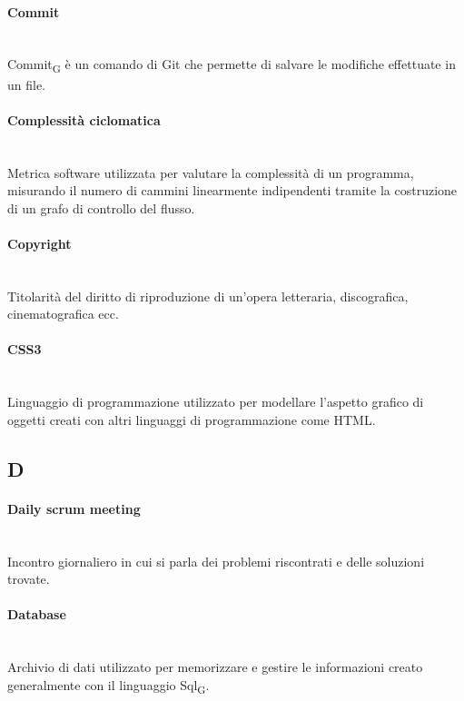 \paragraph{Commit}~\smallskip \\
Commit\textsubscript{G} è un comando di Git che permette di salvare le modifiche effettuate in un file.

\paragraph{Complessità ciclomatica}~\smallskip \\
Metrica software utilizzata per valutare la complessità di un programma, misurando il numero di cammini linearmente indipendenti tramite la costruzione di un grafo di controllo del flusso.

\paragraph{Copyright}~\smallskip \\
Titolarità del diritto di riproduzione di un'opera letteraria, discografica, cinematografica ecc.

\paragraph{CSS3}~\smallskip \\
Linguaggio di programmazione utilizzato per modellare l'aspetto grafico di oggetti creati con altri linguaggi di programmazione come HTML.
\newpage
{}
\subsection*{D}
\paragraph{Daily scrum meeting}~\smallskip \\
Incontro giornaliero in cui si parla dei problemi riscontrati e delle soluzioni trovate.

\paragraph{Database}~\smallskip \\
Archivio di dati utilizzato per memorizzare e gestire le informazioni creato generalmente con il linguaggio Sql\textsubscript{G}.

